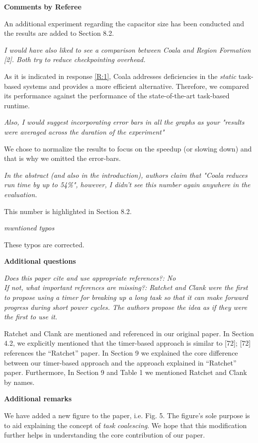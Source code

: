 \documentclass[10pt]{article}
\newcommand{\referee}[1]{
	{\item \color{OliveGreen} \emph{{#1}}}
	\label{R\therefereeCounter:\arabic{enumi}}
}
\newcommand{\response}[1]{{\color{blue} #1}}
\newenvironment{additionalQuestions}{%
\textbf{\large Additional questions}
\begin{enumerate}%
\renewcommand{\labelenumi}{\textbf{[Q:\,\arabic{enumi}]}} %
}{\end{enumerate}}
\newenvironment{editor}{%
\textbf{\large Additional remarks}
\begin{enumerate}%
\renewcommand{\labelenumi}{\textbf{[R:\,\arabic{enumi}]}} %
}{\end{enumerate}}
\newcounter{refereeCounter}
\newenvironment{responses}{%
\refstepcounter{refereeCounter}%
\textbf{\large Comments by Referee \therefereeCounter}
\begin{enumerate}%
\renewcommand{\labelenumi}{\textbf{[C:\,\arabic{enumi}]}} %
}{\end{enumerate}}
\begin{document}
\begin{responses}
\response{An additional experiment regarding the capacitor size has been conducted and the results are added to Section 8.2.}

\referee{I would have also liked to see a comparison between Coala and Region Formation [2]. Both try to reduce checkpointing overhead.}

\response{As it is indicated in response \hyperref[R:1]{[R:1]}, Coala addresses deficiencies in the \emph{static} task-based systems and provides a more efficient alternative. Therefore, we compared its performance against the performance of the state-of-the-art task-based runtime.}

\referee{Also, I would suggest incorporating error bars in all the graphs as your "results were averaged across the duration of the experiment"}

\response{We chose to normalize the results to focus on the speedup (or slowing down) and that is why we omitted the error-bars.}

\referee{In the abstract (and also in the introduction), authors claim that "Coala reduces run time by up to 54\%", however, I didn't see this number again anywhere in the evaluation.}

\response{This number is highlighted in Section 8.2.}



\referee{mwntioned typos}

\response{These typos are corrected.}


\end{responses}


\begin{additionalQuestions}
\referee{Does this paper cite and use appropriate references?: No\\
If not, what important references are missing?: 
Ratchet and Clank were the first to propose using a timer for breaking up a long task so that it can make forward progress during short power cycles.  The authors propose the idea as if they were the first to use it.}

\response{Ratchet and Clank are mentioned and referenced in our original paper. 
In Section 4.2, we explicitly mentioned that the timer-based approach is similar to [72]; [72] references the ``Ratchet'' paper. 
In Section 9 we explained the core difference between our timer-based approach and the approach explained  in ``Ratchet'' paper. Furthermore, In Section 9 and Table 1 we mentioned Ratchet and Clank by names.}
\end{additionalQuestions}

\begin{editor}
\referee{}
\response{We have added a new figure to the paper, i.e. Fig. 5. The figure's sole purpose is to aid explaining the concept of \textit{task coalescing}.
We hope that this modification further helps in understanding the core contribution of our paper.}
\end{editor}
\end{document}

